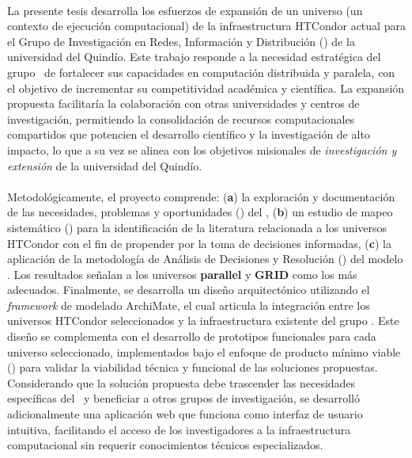 \label{cap:resumen}
\mbox{}\\
\noindent
La presente tesis desarrolla los esfuerzos de expansión de un universo (\ie un contexto de ejecución computacional) de la infraestructura HTCondor actual para el Grupo de Investigación en Redes, Información y Distribución (\GRID) de la universidad del Quindío. Este trabajo responde a la necesidad estratégica del grupo \GRID~de fortalecer sus capacidades en computación distribuida y paralela, con el objetivo de incrementar su competitividad académica y científica. La expansión propuesta facilitaría la colaboración con otras universidades y centros de investigación, permitiendo la consolidación de recursos computacionales compartidos que potencien el desarrollo científico y la investigación de alto impacto, lo que a su vez se alinea con los objetivos misionales de \textit{investigación y extensión} de la universidad del Quindío.
\\\\
Metodológicamente, el proyecto comprende: (\textbf{a}) la exploración y documentación de las necesidades, problemas y oportunidades (\NPO) del \GRID, (\textbf{b}) un estudio de mapeo sistemático (\SMS) para la identificación de la literatura relacionada a los universos HTCondor con el fin de propender por la toma de decisiones informadas, (\textbf{c}) la aplicación de la metodología de Análisis de Decisiones y Resolución (\DAR) del modelo \CMMI. Los resultados señalan a los universos \textbf{parallel} y \textbf{GRID} como los más adecuados. Finalmente, se desarrolla un diseño arquitectónico utilizando el \textit{framework } de modelado ArchiMate, el cual articula la integración entre los universos HTCondor seleccionados y la infraestructura existente del grupo \GRID. Este diseño se complementa con el desarrollo de prototipos funcionales para cada universo seleccionado, implementados bajo el enfoque de producto mínimo viable (\PMV) para validar la viabilidad técnica y funcional de las soluciones propuestas. Considerando que la solución propuesta debe trascender las necesidades específicas del \GRID~y beneficiar a otros grupos de investigación, se desarrolló adicionalmente una aplicación web que funciona como interfaz de usuario intuitiva, facilitando el acceso de los investigadores a la infraestructura computacional sin requerir conocimientos técnicos especializados.







